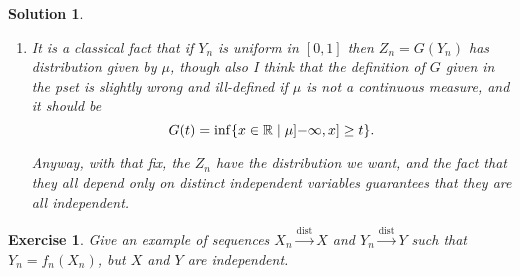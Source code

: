 \documentclass{article}
\newtheorem{ex}{Exercise}
\theoremstyle{nonumberplain}
\newtheorem{sol}{Solution}
\newcommand{\R}{\mathbb{R}}
\newcommand{\PP}{\mathbb{P}}
\begin{document}
\begin{sol}
\begin{enumerate}
Now, define $Y_n$ as the number in $[0,1]$ whose binary digits are given by the $n$-th row of this infinite grid. Each $Y_n$ uses data which is independent from every other $Y_m$, so all the $Y_n$ are independent. Moreover, each $Y_n$ has uniform distribution. To prove this claim, we note that the dyadic intervals in $[0,1]$ generate the Borel $\sigma$-algebra, so to show that a measure coincides with the Lebesgue measure, it suffices to verify that it agrees on the dyadic intervals. Thus, we compute $\PP(Y_n \in D)$ for some dyadic interval of size $2^{-N}$. But this corresponds to prescribing the first $N$ binary digits of $Y_n$, that is,
\begin{equation}
\PP(Y_n \in D) = \PP(X_{n1} = j_1 \land \dots \land X_{nN} = j_N) = 2^{-N},
\end{equation}
by the $X_{ij}$ being i.i.d.

Anyway this finishes the proof.

\item It is a classical fact that if $Y_n$ is uniform in $[0,1]$ then $Z_n = G(Y_n)$ has distribution given by $\mu$, though also I think that the definition of $G$ given in the pset is slightly wrong and ill-defined if $\mu$ is not a continuous measure, and it should be
\begin{equation}
G(t) = \inf\{x \in \R \mid \mu\linterval{-\infty}x \geq t\}.
\end{equation}

Anyway, with that fix, the $Z_n$ have the distribution we want, and the fact that they all depend only on distinct independent variables guarantees that they are all independent.
\end{enumerate}
\end{sol}

\begin{ex}
Give an example of sequences $X_n \xrightarrow{\text{dist}} X$ and $Y_n \xrightarrow{\text{dist}} Y$ such that $Y_n = f_n(X_n)$, but $X$ and $Y$ are independent.
\end{ex}
\end{document}
